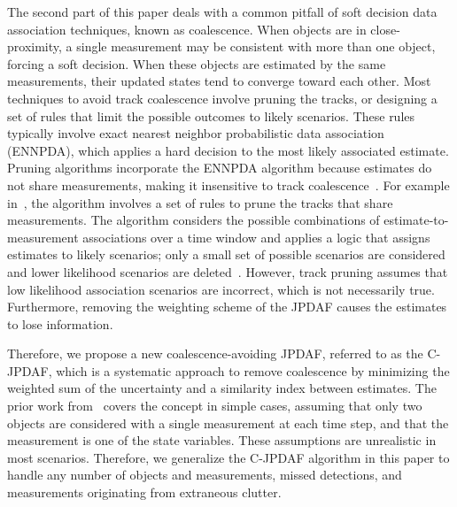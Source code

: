 
The second part of this paper deals with a common pitfall of soft decision data association techniques, known as coalescence.
When objects are in close-proximity, a single measurement may be consistent with more than one object, forcing a soft decision.
When these objects are estimated by the same measurements, their updated states tend to converge toward each other.
Most techniques to avoid track coalescence involve pruning the tracks, or designing a set of rules that limit the possible outcomes to likely scenarios. These rules typically involve exact nearest neighbor probabilistic data association (ENNPDA), which applies a hard decision to the most likely associated estimate. Pruning algorithms incorporate the ENNPDA algorithm because estimates do not share measurements, making it insensitive to track coalescence~\cite{Coal1}.
For example in~\cite{Fitzgerald}, the algorithm involves a set of rules to prune the tracks that share measurements.
The algorithm considers the possible combinations of estimate-to-measurement associations over a time window and applies a logic that assigns estimates to likely scenarios; only a small set of possible scenarios are considered and lower likelihood scenarios are deleted~\cite{Coal_d,Coal_e,Coal_c}.
However, track pruning assumes that low likelihood association scenarios are incorrect, which is not necessarily true.
Furthermore, removing the weighting scheme of the JPDAF causes the estimates to lose information.

Therefore, we propose a new coalescence-avoiding JPDAF, referred to as the C-JPDAF, which is a systematic approach to remove coalescence by minimizing the weighted sum of the uncertainty and a similarity index between estimates. The prior work from~\cite{KauLovLee14} covers the concept in simple cases, assuming that only two objects are considered with a single measurement at each time step, and that the measurement is one of the state variables. These assumptions are unrealistic in most scenarios.
Therefore, we generalize the C-JPDAF algorithm in this paper to handle any number of objects and measurements, missed detections, and measurements originating from extraneous clutter.

